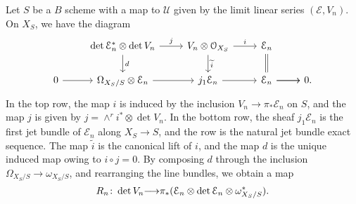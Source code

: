 \documentclass[11pt,reqno]{amsart}
\theoremstyle{plain}
\theoremstyle{definition}
\theoremstyle{remark}
\numberwithin{equation}{section}
\renewcommand{\to}{{\longrightarrow}}
\numberwithin{equation}{section}
\renewcommand{\O}{\mathcal O}
\begin{document}
Let $S$ be a $B$ scheme with a map to $\mathcal U$ given by the limit linear series $(\mathcal E, V_n)$.
On $X_S$, we have the diagram
\begin{equation}
  \label{eq:llspr}
  \begin{tikzcd}
    &\det \mathcal E_n^* \otimes \det V_n\ar{r}{j}\ar{d}{d} & V_n \otimes \O_{X_S}\ar{r}{i}\ar{d}{\widetilde i} & \mathcal E_n\ar[equal]{d}&\\
    0\ar{r} & \Omega_{X_S/S} \otimes \mathcal E_n\ar{r} & j_1 \mathcal E_n\ar{r} &\ar{r} \mathcal E_n \ar{r}& 0.
  \end{tikzcd}
\end{equation}
In the top row, the map $i$ is induced by the inclusion $V_n \to \pi_* \mathcal E_n$ on $S$, and the map $j$ is given by $j = \wedge^r i^* \otimes \det V_n$.
In the bottom row, the sheaf $j_1 \mathcal E_n$ is the first jet bundle of $\mathcal E_n$ along $X_S \to S$, and the row is the natural jet bundle exact sequence.
The map $\widetilde i$ is the canonical lift of $i$, and the map $d$ is the unique induced map owing to $i \circ j = 0$.
By composing $d$ through the inclusion $\Omega_{X_S/S} \to \omega_{X_S/S}$, and rearranging the line bundles, we obtain a map
\begin{equation}\label{eqn:Rn}
  R_n \from \det V_n \to \mathcal \pi_*(\mathcal E_n \otimes \det \mathcal E_n \otimes \omega^*_{X_S/S}).
\end{equation}
\end{document}
